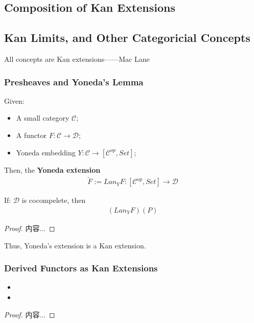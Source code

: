 \documentclass[Total.tex]{subfiles}
\begin{document}
			\subsection{Composition of Kan Extensions}
			\subsection{Kan Limits, and Other Categoricial Concepts}
			
			\begin{center}
				All concepts are Kan extensions\qquad ------Mac Lane
			\end{center}
			
			
			
			\subsubsection{Presheaves and Yoneda's Lemma}
				\begin{proposition}
					Given:
					\begin{itemize}
						\item A small category $\mathcal{C}$;
						\item A functor $F:\mathcal{C}\rightarrow \mathcal{D}$;
						\item Yoneda embedding $Y:\mathcal{C}\rightarrow [\mathcal{C}^{op},Set]$;
					\end{itemize}
					
					
					Then, the \textbf{Yoneda extension}
					\begin{gather*}
						\tilde{F}:=Lan_Y F:[\mathcal{C}^{op},Set]\rightarrow \mathcal{D}
					\end{gather*}
					
					If: $\mathcal{D}$ is cocompelete, then
					\begin{gather*}
						(Lan_Y F)(P)
					\end{gather*}
				\end{proposition}
				\begin{proof}
					内容...
				\end{proof}
				
				Thus, Yoneda's extension is a Kan extension. 
		\subsubsection{Derived Functors as Kan Extensions}
				\begin{proposition}
					\begin{itemize}
						\item 
						
						\item 
					\end{itemize}
				\end{proposition}
				\begin{proof}
					内容...
				\end{proof}
		
\end{document}
